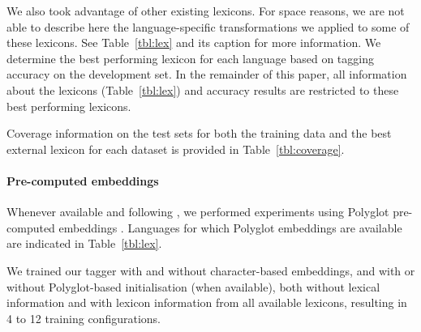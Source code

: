\documentclass[11pt,a4paper]{article}
\begin{document}
We also took advantage of other existing lexicons. For space reasons, we are not able to describe here the
language-specific transformations we applied to some of these lexicons. See Table~\ref{tbl:lex} and its caption for more
information. We determine the best performing lexicon for each language based on tagging accuracy on the development
set. In the remainder of this paper, all information about the lexicons (Table~\ref{tbl:lex}) and accuracy results are
restricted to these best performing lexicons.

Coverage information on the test sets for both the training data and the best external lexicon for each dataset is
provided in Table~\ref{tbl:coverage}.


\paragraph{Pre-computed embeddings}


Whenever available and following \citet{plank16}, we performed experiments using Polyglot pre-computed
embeddings \cite{alrfou13}. Languages for which Polyglot embeddings are available are indicated in Table~\ref{tbl:lex}.

We trained our tagger with and without character-based embeddings, and with or without Polyglot-based
initialisation (when available), both without lexical information and with lexicon information from all available
lexicons, resulting in 4 to 12 training configurations. 
\end{document}
